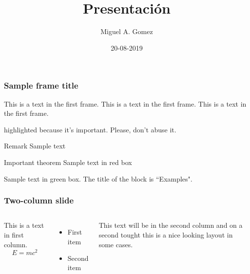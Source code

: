 \documentclass{beamer}
\title{Presentación}
\author{Miguel A. Gomez}
\institute{Fundación Universitaria Konrad Lorenz}
\date{20-08-2019}
\begin{document}
	\frame{\titlepage}
	\begin{frame}
		\frametitle{Sample frame title}
		This is a text in the first frame. This is a text in the first frame. This is a text in the first frame.
	\end{frame}
	\begin{frame}
		\alert{highlighted} because it's important.
		Please, don't abuse it.
		
		\begin{block}{Remark}
			Sample text
		\end{block}
		
		\begin{alertblock}{Important theorem}
			Sample text in red box
		\end{alertblock}
		
		\begin{examples}
			Sample text in green box. The title of the block is ``Examples".
		\end{examples}
	\end{frame}
	\begin{frame}
	\frametitle{Two-column slide}	
		\begin{columns}
			
			\column{0.5\textwidth}
			This is a text in first column.
			$$E=mc^2$$
			\begin{itemize}
				\item First item
				\item Second item
			\end{itemize}
			
			\column{0.5\textwidth}
			This text will be in the second column
			and on a second tought this is a nice looking
			layout in some cases.
		\end{columns}
	\end{frame}
\end{document}
